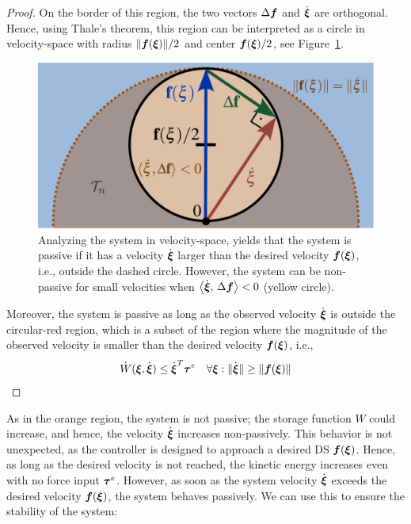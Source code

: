 \begin{proof}
On the border of this region, the two vectors $\Delta \boldsymbol{f}$ and $\dot{{\boldsymbol{\xi}}}$ are orthogonal.
Hence, using Thale's theorem, this region can be interpreted as a circle in velocity-space with radius $\| \boldsymbol{f} ({\boldsymbol{\xi}}) \| / 2$ and center $\boldsymbol{f}({\boldsymbol{\xi}}) / 2$, see Figure~\ref{fig:passivity_analysis}.

\begin{figure}[thb]
	\centering
    \includegraphics[width=1.0\columnwidth]{figures/passivity_analysis}
	\caption{Analyzing the system in velocity-space, yields that the system is passive if it has a velocity $\dot{\boldsymbol{\xi}}$ larger than the desired velocity $\boldsymbol{f}(\boldsymbol{\xi})$, i.e., outside the dashed circle.
    However, the system can be non-passive for small velocities when  $\left\langle {\dot{\boldsymbol{\xi}}}, \, {\Delta \boldsymbol{f}} \right\rangle < 0$ (yellow circle).}
	\label{fig:passivity_analysis}
\end{figure}

Moreover, the system is passive as long as the observed velocity $\dot{{\boldsymbol{\xi}}}$ is outside the circular-red region, which is a subset of the region where the magnitude of the observed velocity is smaller than the desired velocity $\boldsymbol{f}({\boldsymbol{\xi}})$, i.e.,
\begin{equation}
	\dot W({\boldsymbol{\xi}}, \dot{{\boldsymbol{\xi}}}) \leq \dot{{\boldsymbol{\xi}}}^T \boldsymbol{\tau}^e
 \quad \forall {\boldsymbol{\xi}} : \| \dot{{\boldsymbol{\xi}}} \| \geq\| \boldsymbol{f}({\boldsymbol{\xi}}) \| 
\end{equation}

\end{proof}

As in the orange region, the system is not passive; the storage function $W$ could increase, and hence, the velocity $\dot {\boldsymbol{\xi}}$ increases non-passively. This behavior is not unexpected, as the controller is designed to approach a desired DS $\boldsymbol{f}({\boldsymbol{\xi}})$. Hence, as long as the desired velocity is not reached, the kinetic energy increases even with no force input $\boldsymbol{\tau}^e$. However, as soon as the system velocity $\dot{\boldsymbol{\xi}}$ exceeds the desired velocity $\boldsymbol{f}(\boldsymbol{\xi})$, the system behaves passively. We can use this to ensure the stability of the system:

